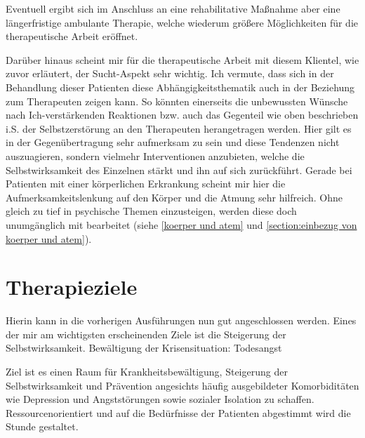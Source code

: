 Eventuell ergibt sich im Anschluss an eine rehabilitative Maßnahme aber eine längerfristige ambulante Therapie, welche wiederum größere Möglichkeiten für die therapeutische Arbeit eröffnet. 

Darüber hinaus scheint mir für die therapeutische Arbeit mit diesem Klientel, wie zuvor erläutert, der Sucht-Aspekt sehr wichtig. Ich vermute, dass sich in der Behandlung dieser Patienten diese Abhängigkeitsthematik auch in der Beziehung zum Therapeuten zeigen kann. So könnten einerseits die unbewussten Wünsche nach Ich-verstärkenden Reaktionen bzw. auch das Gegenteil wie oben beschrieben i.S. der Selbstzerstörung an den Therapeuten herangetragen werden. Hier gilt es in der Gegenübertragung sehr aufmerksam zu sein und diese Tendenzen nicht auszuagieren, sondern vielmehr Interventionen anzubieten, welche die Selbstwirksamkeit des Einzelnen stärkt und ihn auf sich zurückführt. Gerade bei Patienten mit einer körperlichen Erkrankung scheint mir hier die Aufmerksamkeitslenkung auf den Körper und die Atmung sehr hilfreich. Ohne gleich zu tief in psychische Themen einzusteigen, werden diese doch unumgänglich mit bearbeitet (siehe \ref{koerper und atem} und \ref{section:einbezug von koerper und atem}). 

\section{Therapieziele}
Hierin kann in die vorherigen Ausführungen nun gut angeschlossen werden. Eines der mir am wichtigsten erscheinenden Ziele ist die Steigerung der Selbstwirksamkeit. 
Bewältigung der Krisensituation: Todesangst 

Ziel ist es einen Raum für Krankheitsbewältigung, Steigerung der Selbstwirksamkeit und Prävention angesichts häufig ausgebildeter Komorbiditäten wie Depression und Angststörungen sowie sozialer Isolation zu schaffen. Ressourcenorientiert und auf die Bedürfnisse der Patienten abgestimmt wird die Stunde gestaltet.


